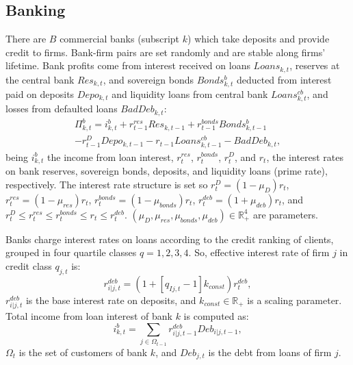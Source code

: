 \documentclass[a4paper,11pt]{article}
\begin{document}
\begin{appendices}
\subsection*{Banking}

There are $B$ commercial banks (subscript $k$) which take deposits and provide credit to firms. Bank-firm pairs are set randomly and are stable along firms' lifetime. Bank profits come from interest received on loans $Loans_{k,t}$, reserves at the central bank $Res_{k,t}$, and sovereign bonds $Bonds_{k,t}^b$ deducted from interest paid on deposits $Depo_{k,t}$ and liquidity loans from central bank $Loans^{cb}_{k,t}$, and losses from defaulted loans $BadDeb_{k,t}$:
\begin{multline}
	\Pi^b_{k,t} = i_{k,t}^b + r_{t-1}^{res} Res_{k,t-1} + r_{t-1}^{bonds} Bonds_{k,t-1}^b \\
	- r_{t-1}^D Depo_{k,t-1} - r_{t-1} Loans^{cb}_{k,t-1} - BadDeb_{k,t},
\end{multline}
being $i_{k,t}^b$ the income from loan interest, $r_t^{res}$, $r_t^{bonds}$, $r_t^D$, and $r_t$, the interest rates on bank reserves, sovereign bonds, deposits, and liquidity loans (prime rate), respectively. The interest rate structure is set so $r_t^D = ( 1 - \mu_D ) r_t$, $r_t^{res} = ( 1 - \mu_{res} ) r_t$, $r_t^{bonds} = ( 1 - \mu_{bonds} ) r_t$, $r_t^{deb} = ( 1 + \mu_{deb} ) r_t$, and $r_t^D \le r_t^{res} \le r_t^{bonds} \le r_t \le r_t^{deb}$. $( \mu_D, \mu_{res}, \mu_{bonds}, \mu_{deb} ) \in \mathbb{R}_+^4$ are parameters.

Banks charge interest rates on loans according to the credit ranking of clients, grouped in four quartile classes $q = 1,2,3,4$. So, effective interest rate of firm $j$ in credit class $q_{j,t}$ is:
\begin{equation}
	r_{i|j,t}^{deb} = \left( 1 + \left[  q_{Ij,t} - 1 \right]  k_{const} \right) r_t^{deb},
\end{equation}
$r_{i|j,t}^{deb}$ is the base interest rate on deposits, and $k_{const} \in \mathbb{R}_+$ is a scaling parameter. Total income from loan interest of bank $k$ is computed as:
\begin{equation}
	i_{k,t}^b = \sum_{j \in \Omega_{t-1}} r_{i|j,t-1}^{deb} Deb_{i|j,t-1},
\end{equation}
$\Omega_t$ is the set of customers of bank $k$, and $Deb_{j,t}$ is the debt from loans of firm $j$.


\end{appendices}
\end{document}
